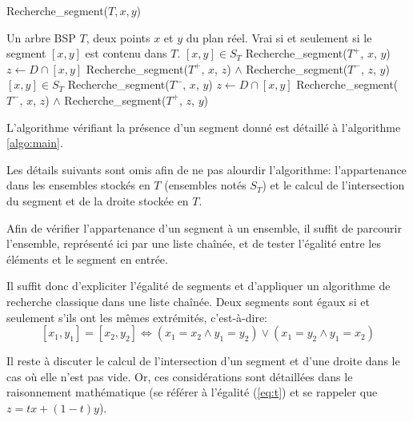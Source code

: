 
\begin{algorithm}
  \caption{Recherche\_segment($T, x, y$)}
  \begin{algorithmic}[1] \label{algo:main}
    \REQUIRE Un arbre BSP $T$, deux points $x$ et $y$ du plan réel.
    \ENSURE Vrai si et seulement si le segment $[x, y]$ est contenu dans $T$.
    \RETURN $[x, y]\in S_T$
    \ENDIF
      \RETURN Recherche\_segment($T^+$, $x$, $y$)
      \ELSE
      \STATE $z \leftarrow D \cap [x, y]$
      \RETURN Recherche\_segment($T^+$, $x$, $z$) $\land$
              Recherche\_segment($T^-$, $z$, $y$)
      \ENDIF
      \ELSE
      \RETURN $[x, y]\in S_T$
      \RETURN Recherche\_segment($T^-$, $x$, $y$)
      \ELSE
      \STATE $z \leftarrow D \cap [x, y]$
      \RETURN Recherche\_segment($T^-$, $x$, $z$) $\land$
              Recherche\_segment($T^+$, $z$, $y$)
      \ENDIF
    \ENDIF
  \end{algorithmic}
\end{algorithm}

L'algorithme vérifiant la présence d'un segment donné est détaillé à
l'algorithme \ref{algo:main}.

Les détails suivants sont omis afin de ne pas alourdir l'algorithme:
l'appartenance dans les ensembles stockés en $T$ (ensembles notés
$S_T$) et le calcul de l'intersection du segment et de la
droite stockée en $T$.

Afin de vérifier l'appartenance d'un segment à un ensemble, il
suffit de parcourir l'ensemble, représenté ici par une liste
chaînée, et de tester l'égalité entre les éléments et le segment
en entrée.

Il suffit donc d'expliciter l'égalité de segments et d'appliquer
un algorithme de recherche classique dans une liste chaînée.
Deux segments sont égaux si et seulement s'ils ont les
mêmes extrémités, c'est-à-dire:
$$ [x_1, y_1] = [x_2, y_2] \iff
(x_1 = x_2 \land y_1 = y_2) \lor (x_1 = y_2 \land y_1 = x_2) $$

Il reste à discuter le calcul de l'intersection d'un segment
et d'une droite dans le cas où elle n'est pas vide. Or, ces
considérations sont détaillées dans le raisonnement mathématique
(se référer à l'égalité (\ref{eq:t}) et se rappeler que $z = tx + (1-t) y$).
